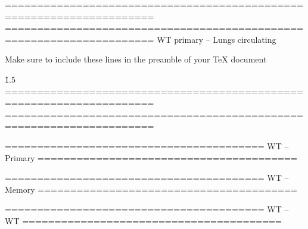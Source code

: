 

=====================================================================
=====================================================================
                   WT primary -- Lungs circulating

Make sure to include these lines in the preamble of your TeX document

\usepackage{tikz}
\pgfmathsetmacro\r{1.5}
=====================================================================
=====================================================================




========================================
             WT -- Primary
========================================




========================================
              WT -- Memory
========================================




========================================
                WT -- WT
========================================

